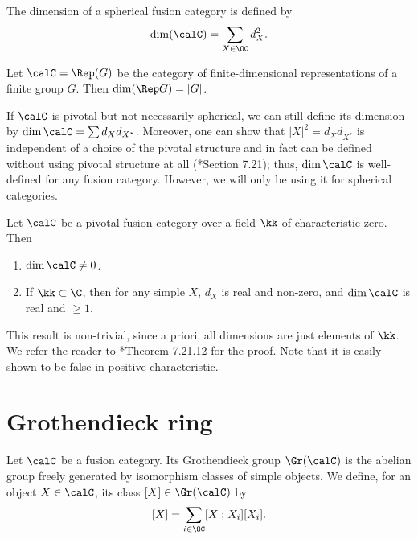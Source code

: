 \begin{definition}
  The dimension of a spherical fusion category is defined by
  $$
    \dim(\calC)=\sum_{X\in \OC} d_X^2.
  $$
\end{definition}

\begin{example}\label{x:dim-repg}
  Let $\calC=\Rep(G)$ be the category of finite-dimensional representations of
  a finite group $G$. Then $\dim (\Rep G)=|G|$.
\end{example}

\begin{remark}
  If $\calC$ is pivotal but not necessarily spherical, we can still define its
  dimension by $\dim \calC=\sum d_X d_{X^*}$. Moreover, one can show that
  $|X|^2=d_X d_{X^*}$ is independent of a choice of the pivotal structure and in
  fact can be defined without using pivotal structure at all
  (*{Section 7.21}); thus, $\dim \calC$ is well-defined
  for any fusion category. However, we will only be using it for spherical
  categories.
\end{remark}

\begin{theorem}\label{t:dim-nonzero}
  Let $\calC$ be a pivotal fusion category over a field $\kk$ of
  characteristic zero. Then
  \begin{enumerate}
    \item $\dim \calC\ne 0$.
    \item If $\kk\subset\C$, then for any simple $X$,
  $d_X$ is real and non-zero, and $\dim \calC$ is real and $\ge1$.
  \end{enumerate}
\end{theorem}
This result is non-trivial, since a priori, all dimensions are just elements of
$\kk$. We refer the reader to *{Theorem 7.21.12} for the
proof. Note that it is easily shown to be false in positive characteristic.

\section{Grothendieck ring}\label{s:grothendieck-ring}
\begin{definition}\label{d:grothendieck}
  Let $\calC$ be a fusion category. Its Grothendieck group $\Gr(\calC)$ is the
  abelian group freely generated by isomorphism classes of simple objects. We
  define, for an object $X\in \calC$, its class $[X]\in \Gr(\calC)$ by
  $$
    [X]=\sum_{i\in \OC} [X:X_i] [X_i].
  $$
\end{definition}

